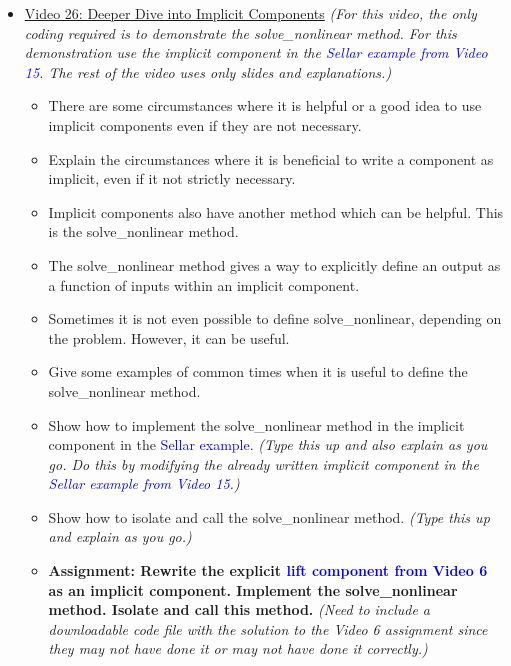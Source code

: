 \documentclass[12pt, letterpaper]{article}
\begin{document}
\begin{itemize}
	\item \underline{Video 26: Deeper Dive into Implicit Components} \textit{(For this video, the only coding required is to demonstrate the solve\_nonlinear method. For this demonstration use the implicit component in the \textcolor{blue}{Sellar example from Video 15}. The rest of the video uses only slides and explanations.)}
		\begin{itemize}
			\item There are some circumstances where it is helpful or a good idea to use implicit components even if they are not necessary.
			\item Explain the circumstances where it is beneficial to write a component as implicit, even if it not strictly necessary. 
			\item Implicit components also have another method which can be helpful. This is the solve\_nonlinear method.
			\item The solve\_nonlinear method gives a way to explicitly define an output as a function of inputs within an implicit component.
			\item Sometimes it is not even possible to define solve\_nonlinear, depending on the problem. However, it can be useful.
			\item Give some examples of common times when it is useful to define the solve\_nonlinear method.
			\item Show how to implement the solve\_nonlinear method in the implicit component in the \textcolor{blue}{Sellar example}. \textit{(Type this up and also explain as you go. Do this by modifying the already written implicit component in the \textcolor{blue}{Sellar example from Video 15}.)}
			\item Show how to isolate and call the solve\_nonlinear method. \textit{(Type this up and explain as you go.)}
			\item \textbf{Assignment: Rewrite the explicit \textcolor{blue}{lift component from Video 6} as an implicit component. Implement the solve\_nonlinear method. Isolate and call this method.} \textit{(Need to include a downloadable code file with the solution to the Video 6 assignment since they may not have done it or may not have done it correctly.)}
		\end{itemize}


\end{itemize}
\end{document}
